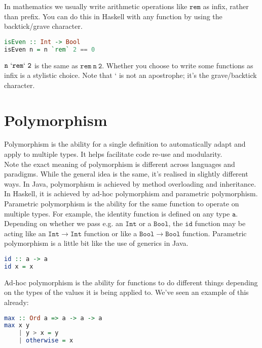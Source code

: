 \documentclass[a4paper,12pt]{article}
\newcommand{\keywadj}[1]{\mathtt{#1}}
\begin{document}
\noindent
In mathematics we usually write arithmetic operations like $\keywadj{rem}$ as infix, rather than prefix. You can do this in Haskell with any function by using the backtick/grave character.

\begin{lstlisting}[language=Haskell]
isEven :: Int -> Bool
isEven n = n `rem` 2 == 0
\end{lstlisting}

\noindent
$\keywadj{n~`rem`~2}$ is the same as $\keywadj{rem~n~2}$. Whether you choose to write some functions as infix is a stylistic choice. Note that ` is not an apostrophe; it's the grave/backtick character. 

\section{Polymorphism}

\noindent
Polymorphism is the ability for a single definition to automatically adapt and apply to multiple types. It helps facilitate code re-use and modularity.\\

\noindent
 Note the exact meaning of polymorphism is different across languages and paradigms. While the general idea is the same, it's realised in slightly different ways. In Java, polymorphism is achieved by method overloading and inheritance. In Haskell, it is achieved by ad-hoc polymorphism and parametric polymorphism. \\

\noindent
Parametric polymorphism is the ability for the same function to operate on multiple types. For example, the identity function is defined on any type $\keywadj{a}$. Depending on whether we pass e.g. an $\keywadj{Int}$ or a $\keywadj{Bool}$, the $\keywadj{id}$ function may be acting like an $\keywadj{Int \rightarrow Int}$ function or like a $\keywadj{Bool \rightarrow Bool}$ function. Parametric polymorphism is a little bit like the use of generics in Java.

\begin{lstlisting}[language=Haskell]
id :: a -> a
id x = x
\end{lstlisting}

\noindent
Ad-hoc polymorphism is the ability for functions to do different things depending on the types of the values it is being applied to. We've seen an example of this already:

\begin{lstlisting}[language=Haskell]
max :: Ord a => a -> a -> a
max x y
	| y > x = y
	| otherwise = x
\end{lstlisting}
\end{document}
